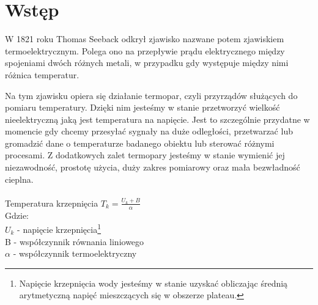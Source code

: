 {\section{Wstęp}}
W 1821 roku Thomas Seeback odkrył zjawisko nazwane potem zjawiskiem termoelektrycznym. Polega ono na przepływie prądu elektrycznego między spojeniami dwóch różnych metali, w przypadku gdy występuje między nimi różnica temperatur.

Na tym zjawisku opiera się działanie termopar, czyli przyrządów służących do pomiaru temperatury. Dzięki nim jesteśmy w stanie przetworzyć wielkość nieelektryczną jaką jest temperatura na napięcie. Jest to szczególnie przydatne w momencie gdy chcemy przesyłać sygnały na duże odległości, przetwarzać lub gromadzić dane o temperaturze badanego obiektu lub sterować różnymi procesami. Z dodatkowych zalet termopary jesteśmy w stanie wymienić jej niezawodność, prostotę użycia, duży zakres pomiarowy oraz mała bezwładność cieplna. \\

 \\

Temperatura krzepnięcia \dotfill \quad $\displaystyle T_k = \frac{U_k + B}{\alpha}$ \\
{ \small Gdzie:\\
\indent $U_k$ - napięcie krzepnięcia\footnote{Napięcie krzepnięcia wody jesteśmy w stanie uzyskać obliczając średnią arytmetyczną napięć mieszczących się w obszerze plateau.} \\
\indent B - współczynnik równania liniowego \\
\indent $\alpha$ - współczynnik termoelektryczny \\
}
